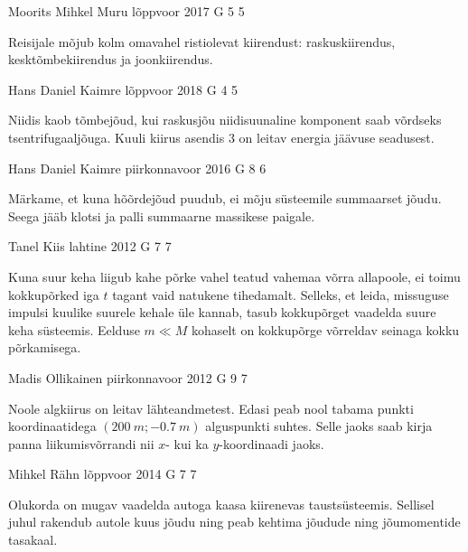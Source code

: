 \documentclass[11pt, twoside]{article}
\begin{document}
{%
{Moorits Mihkel Muru} %
{lõppvoor} %
{2017} %
{G 5} %
{5} %
{

\ifHint
Reisijale mõjub kolm omavahel ristiolevat kiirendust: raskuskiirendus, kesktõmbekiirendus ja joonkiirendus.
\fi
}

{Hans Daniel Kaimre} %
{lõppvoor} %
{2018} %
{G 4} %
{5} %
{

\ifHint
Niidis kaob tõmbejõud, kui raskusjõu niidisuunaline komponent saab võrdseks tsentrifugaaljõuga. Kuuli kiirus asendis 3 on leitav energia jäävuse seadusest.
\fi
}

{Hans Daniel Kaimre} %
{piirkonnavoor} %
{2016} %
{G 8} %
{6} %
{

\ifHint
Märkame, et kuna hõõrdejõud puudub, ei mõju süsteemile summaarset jõudu. Seega jääb klotsi ja palli summaarne massikese paigale.
\fi
}

{Tanel Kiis} %
{lahtine} %
{2012} %
{G 7} %
{7} %
{

\ifHint
Kuna suur keha liigub kahe põrke vahel teatud vahemaa võrra allapoole, ei toimu kokkupõrked iga $t$ tagant vaid natukene tihedamalt. Selleks, et leida, missuguse impulsi kuulike suurele kehale üle kannab, tasub kokkupõrget vaadelda suure keha süsteemis. Eelduse $m\ll M$ kohaselt on kokkupõrge võrreldav seinaga kokku põrkamisega.
\fi
}

{Madis Ollikainen} %
{piirkonnavoor} %
{2012} %
{G 9} %
{7} %
{

\ifHint
Noole algkiirus on leitav lähteandmetest. Edasi peab nool tabama punkti koordinaatidega $(\SI{200}{m};\SI{-0,7}{m})$ alguspunkti suhtes. Selle jaoks saab kirja panna liikumisvõrrandi nii $x$- kui ka $y$-koordinaadi jaoks.
\fi
}

{Mihkel Rähn} %
{lõppvoor} %
{2014} %
{G 7} %
{7} %
{

\ifHint
Olukorda on mugav vaadelda autoga kaasa kiirenevas taustsüsteemis. Sellisel juhul rakendub autole kuus jõudu ning peab kehtima jõudude ning jõumomentide tasakaal.
\fi
}

}
\end{document}
